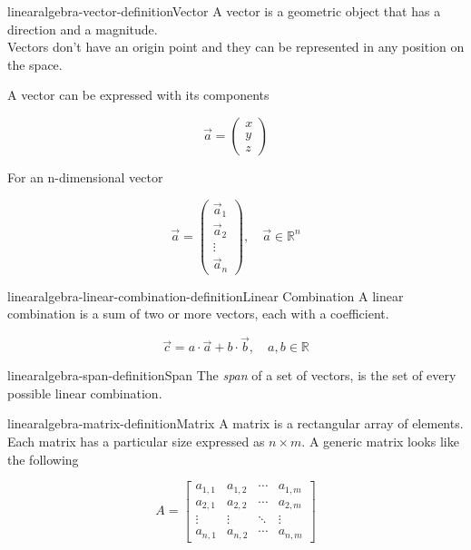 \documentclass[preview]{standalone}
\begin{document}
\begin{snippetdefinition}{linearalgebra-vector-definition}{Vector}
    A vector is a geometric object that has a direction and a magnitude. \\
    Vectors don't have an origin point and they can be represented in any position on the space.

    A vector can be expressed with its components

    \[
        \vec{a} =
        \begin{pmatrix}
            x \\
            y \\
            z
        \end{pmatrix}
    \]

    For an n-dimensional vector

    \[
        \vec{a} =
        \begin{pmatrix}
            \vec{a}_1 \\
            \vec{a}_2 \\
            \vdots \\
            \vec{a}_n
        \end{pmatrix},
        \quad \vec{a} \in \mathbb{R}^n
    \]
\end{snippetdefinition}

\begin{snippetdefinition}{linearalgebra-linear-combination-definition}{Linear Combination}
    A linear combination is a sum of two or more vectors, each with a coefficient.

    \[
        \vec{c} = a \cdot\vec{a} + b\cdot\vec{b},
        \quad a,b\in \mathbb{R}
    \]
\end{snippetdefinition}

\begin{snippetdefinition}{linearalgebra-span-definition}{Span}
    The \textit{span} of a set of vectors, is the set of every possible linear combination.
\end{snippetdefinition}

\begin{snippetdefinition}{linearalgebra-matrix-definition}{Matrix}
    A matrix is a rectangular array of elements.
    Each matrix has a particular size expressed as \(n \times m\).
    A generic matrix looks like the following

    \[
    A = \begin{bmatrix} 
            a_{1,1} & a_{1,2} & \cdots & a_{1,m} \\
            a_{2,1} & a_{2,2} & \cdots & a_{2,m} \\
            \vdots  & \vdots  & \ddots & \vdots  \\
            a_{n,1} & a_{n,2} & \cdots & a_{n,m} 
        \end{bmatrix}
    \]
\end{snippetdefinition}
\end{document}

